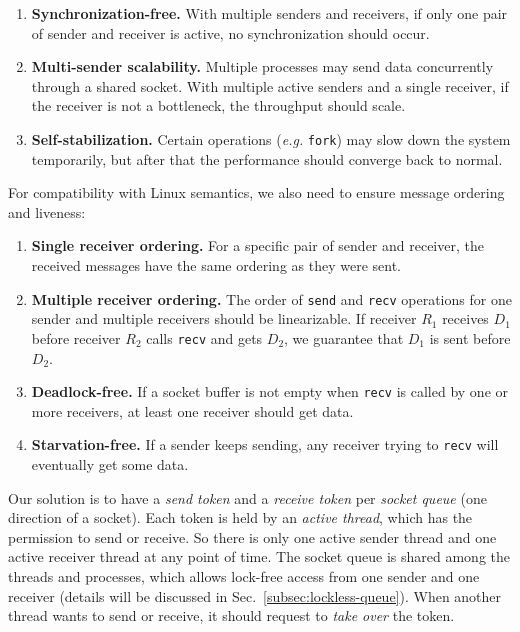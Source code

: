 \begin{enumerate}
 \item \textbf{Synchronization-free.} With multiple senders and receivers, if only one pair of sender and receiver is active, no synchronization should occur.
 \item \textbf{Multi-sender scalability.} Multiple processes may send data concurrently through a shared socket. With multiple active senders and a single receiver, if the receiver is not a bottleneck, the throughput should scale.
 \item \textbf{Self-stabilization.} Certain operations (\textit{e.g.} \texttt{fork}) may slow down the system temporarily, but after that the performance should converge back to normal.
\end{enumerate}

For compatibility with Linux semantics, we also need to ensure message ordering and liveness:
\begin{enumerate}
\item \textbf{Single receiver ordering.} For a specific pair of sender and receiver, the received messages have the same ordering as they were sent.
\item \textbf{Multiple receiver ordering.} The order of \texttt{send} and \texttt{recv} operations for one sender and multiple receivers should be linearizable. If receiver $R_1$ receives $D_1$ before receiver $R_2$ calls \texttt{recv} and gets $D_2$, we guarantee that $D_1$ is sent before $D_2$.
\item \textbf{Deadlock-free.} If a socket buffer is not empty when \texttt{recv} is called by one or more receivers, at least one receiver should get data.
\item \textbf{Starvation-free.} If a sender keeps sending, any receiver trying to \texttt{recv} will eventually get some data.
\end{enumerate}
\fi

Our solution is to have a \emph{send token} and a \emph{receive token} per \emph{socket queue} (one direction of a socket).
Each token is held by an \emph{active thread}, which has the permission to send or receive.
So there is only one active sender thread and one active receiver thread at any point of time.
The socket queue is shared among the threads and processes, which allows lock-free access from one sender and one receiver (details will be discussed in Sec.~\ref{subsec:lockless-queue}).
When another thread wants to send or receive, it should request to \emph{take over} the token.

